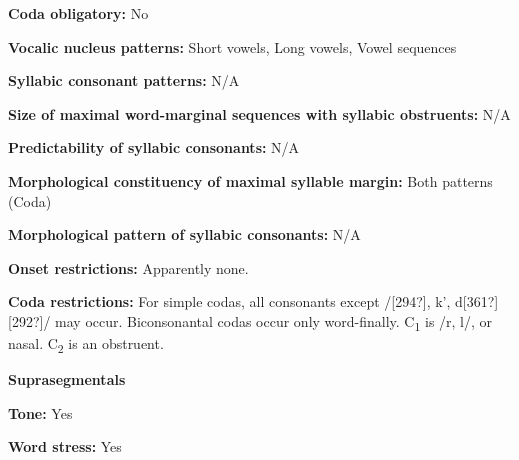 \begin{styleBody}
\textbf{Coda obligatory:} No
\end{styleBody}

\begin{styleBody}
\textbf{Vocalic nucleus patterns:} Short vowels, Long vowels, Vowel sequences
\end{styleBody}

\begin{styleBody}
\textbf{Syllabic consonant patterns:} N/A
\end{styleBody}

\begin{styleBody}
\textbf{Size of maximal word{}-marginal sequences with syllabic obstruents:} N/A
\end{styleBody}

\begin{styleBody}
\textbf{Predictability of syllabic consonants:} N/A
\end{styleBody}

\begin{styleBody}
\textbf{Morphological constituency of maximal syllable margin:} Both patterns (Coda)
\end{styleBody}

\begin{styleBody}
\textbf{Morphological pattern of syllabic consonants:} N/A
\end{styleBody}

\begin{styleBody}
\textbf{Onset restrictions: }Apparently none.
\end{styleBody}

\begin{styleBody}
\textbf{Coda restrictions: }For simple codas, all consonants except /[294?], k’, d[361?][292?]/ may occur. Biconsonantal codas occur only word-finally. C\textsubscript{1} is /r, l/, or nasal. C\textsubscript{2} is an obstruent.
\end{styleBody}

\begin{styleBody}
\textbf{Suprasegmentals}
\end{styleBody}

\begin{styleBody}
\textbf{Tone:} Yes
\end{styleBody}

\begin{styleBody}
\textbf{Word stress:} Yes
\end{styleBody}

